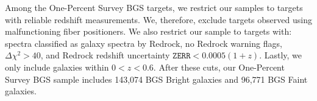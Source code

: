 Among the One-Percent Survey BGS targets, we restrict our samples to targets 
with reliable redshift measurements. 
We, therefore, exclude targets observed using malfunctioning fiber positioners.
We also restrict our sample to targets with: spectra classified as galaxy
spectra by {\sc Redrock}, no {\sc Redrock} warning flags, $\Delta\chi^2 > 40$,
and {\sc Redrock} redshift uncertainty $\mathtt{ZERR} < 0.0005 (1 + z)$.
Lastly, we only include galaxies within $0 < z < 0.6$.  
After these cuts, our One-Percent Survey BGS sample includes 143,074 BGS Bright
galaxies and 96,771 BGS Faint galaxies.

